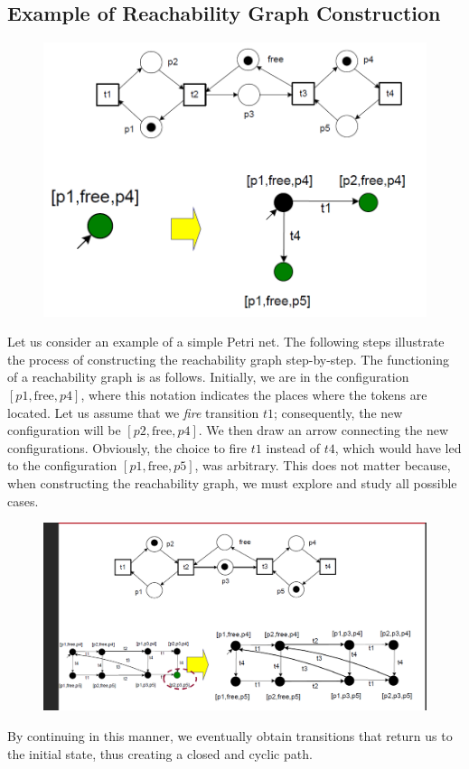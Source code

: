     \subsection{Example of Reachability Graph Construction}
    
    \begin{figure}
        \centering
        \includegraphics[width=0.5\linewidth]{capitolo 4/reachability graph 1.png}
    \end{figure}
    Let us consider an example of a simple Petri net. The following steps illustrate the process of constructing the reachability graph step-by-step. The functioning of a reachability graph is as follows. Initially, we are in the configuration \([p1, \text{free}, p4]\), where this notation indicates the places where the tokens are located. Let us assume that we \textit{fire} transition \(t1\); consequently, the new configuration will be \([p2, \text{free}, p4]\). We then draw an arrow connecting the new configurations. Obviously, the choice to fire \(t1\) instead of \(t4\), which would have led to the configuration \([p1, \text{free}, p5]\), was arbitrary. This does not matter because, when constructing the reachability graph, we must explore and study all possible cases.
    \begin{figure}[h]
        \centering
        \includegraphics[width=0.8\linewidth]{capitolo 4/reachability graph 2.png}
    \end{figure}
    
    By continuing in this manner, we eventually obtain transitions that return us to the initial state, thus creating a closed and cyclic path.
    
